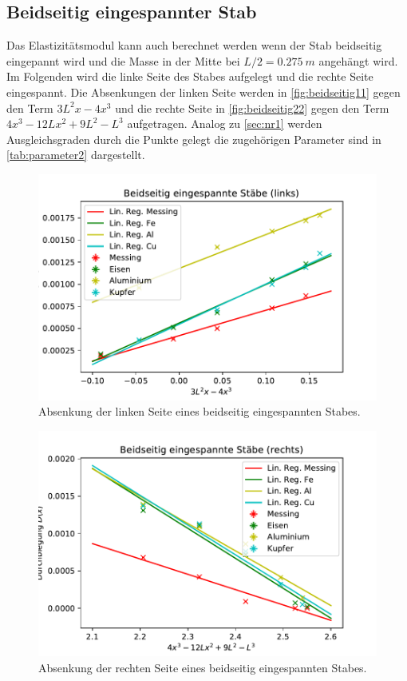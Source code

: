 \subsection{Beidseitig eingespannter Stab}
Das Elastizitätsmodul kann auch berechnet werden wenn der Stab beidseitig eingepannt wird und die 
Masse in der Mitte bei $L/2=\SI[]{0.275}[]{m}$ angehängt wird. Im Folgenden wird die linke Seite des Stabes aufgelegt und
die rechte Seite eingespannt. Die Absenkungen der linken Seite werden in \autoref{fig:beidseitig11} gegen den Term
$3L^2x-4x^3$ und die rechte Seite in \autoref{fig:beidseitig22} gegen den Term $4x^3-12Lx^2+9L^2-L^3$ aufgetragen.
Analog zu \autoref{sec:nr1} werden Ausgleichsgraden durch die Punkte gelegt die zugehörigen Parameter sind in
\autoref{tab:parameter2} dargestellt.
\begin{figure}
    \centering
    \includegraphics{beidseitig1.pdf}
    \caption{Absenkung der linken Seite eines beidseitig eingespannten Stabes.}
    \label{fig:beidseitig11}
  \end{figure}
  \begin{figure}
    \centering
    \includegraphics{beidseitig2.pdf}
    \caption{Absenkung der rechten Seite eines beidseitig eingespannten Stabes.}
    \label{fig:beidseitig22}
  \end{figure}

